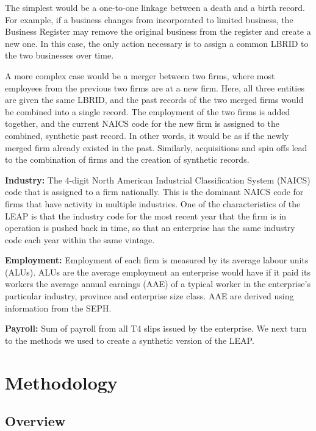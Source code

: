 \documentclass{article}
\begin{document}
The simplest would be a one-to-one linkage between a death and a birth record. For example, if a business changes from incorporated to limited business, the Business Register may remove the original business from the register and create a new one. In this case, the only action necessary is to assign a common LBRID to the two businesses over time. 

A more complex case would be a merger between two firms, where most employees from the previous two firms are at a new firm. Here, all three entities are given the same LBRID, and the past records of the two merged firms would be combined into a single record. The employment of the two firms is added together, and the current NAICS code for the new firm is assigned to the combined, synthetic past record. In other words, it would be as if the newly merged firm already existed in the past. Similarly, acquisitions and spin offs lead to the combination of firms and the creation of synthetic records. 

\textbf{Industry:} The 4-digit North American Industrial Classification System (NAICS) code that is assigned to a firm nationally. This is the dominant NAICS code for firms that have activity in multiple industries. One of the characteristics of the LEAP is that the industry code for the most recent year that the firm is in operation is pushed back in time, so that an enterprise has the same industry code each year within the same vintage.  

\textbf{Employment:} Employment of each firm is measured by its average labour units (ALUs). ALUs are the average employment an enterprise would have if it paid its workers the average annual earnings (AAE) of a typical worker in the enterprise's particular industry, province and enterprise size class. AAE are derived using information from the SEPH.

\textbf{Payroll:} Sum of payroll from all T4 slips issued by the enterprise.
We next turn to the methods we used to create a synthetic version of the LEAP.

\section{Methodology}

\subsection{Overview}
\end{document}
